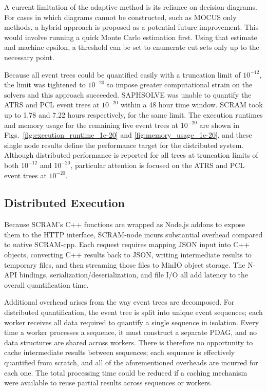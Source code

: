 A current limitation of the adaptive method is its reliance on decision diagrams. For cases in which diagrams cannot be constructed, such as MOCUS only methods, a hybrid approach is proposed as a potential future improvement. This would involve running a quick Monte Carlo estimation first. Using that estimate and machine epsilon, a threshold can be set to enumerate cut sets only up to the necessary point.

%

\iffalse

Because all event trees could be quantified easily with a truncation limit of \(10^{-12}\), the limit was tightened to \(10^{-20}\) to impose greater computational strain on the solvers and this approach succeeded. SAPHSOLVE was unable to quantify the ATRS and PCL event trees at \(10^{-20}\) within a 48 hour time window. SCRAM took up to 1.78 and 7.22 hours respectively, for the same limit. The execution runtimes and memory usage for the remaining five event trees at \(10^{-20}\) are shown in Figs.~\ref{fig:execution_runtime_1e-20} and \ref{fig:memory_usage_1e-20}, and these single node results define the performance target for the distributed system. Although distributed performance is reported for all trees at truncation limits of both \(10^{-12}\) and \(10^{-20}\), particular attention is focused on the ATRS and PCL event trees at \(10^{-20}\).

\subsection{Distributed Execution}

Because SCRAM’s C++ functions are wrapped as Node.js addons to expose them to the HTTP interface, SCRAM-node incurs substantial overhead compared to native SCRAM-cpp. Each request requires mapping JSON input into C++ objects, converting C++ results back to JSON, writing intermediate results to temporary files, and then streaming those files to MinIO object storage. The N-API bindings, serialization/deserialization, and file I/O all add latency to the overall quantification time.

Additional overhead arises from the way event trees are decomposed. For distributed quantification, the event tree is split into unique event sequences; each worker receives all data required to quantify a single sequence in isolation. Every time a worker processes a sequence, it must construct a separate PDAG, and no data structures are shared across workers. There is therefore no opportunity to cache intermediate results between sequences; each sequence is effectively quantified from scratch, and all of the aforementioned overheads are incurred for each one. The total processing time could be reduced if a caching mechanism were available to reuse partial results across sequences or workers.

